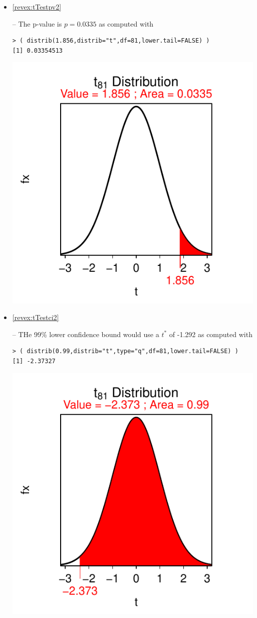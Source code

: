 \documentclass[10pt,openany]{book}\usepackage[]{graphicx}\usepackage[]{color}
\makeatletter
\newenvironment{kframe}{%
 \def\at@end@of@kframe{}%
 \ifinner\ifhmode%
  \def\at@end@of@kframe{\end{minipage}}%
  \begin{minipage}{\columnwidth}%
 \fi\fi%
 \def\FrameCommand##1{\hskip\@totalleftmargin \hskip-\fboxsep
 \colorbox{shadecolor}{##1}\hskip-\fboxsep
     \hskip-\linewidth \hskip-\@totalleftmargin \hskip\columnwidth}%
 \MakeFramed {\advance\hsize-\width
   \@totalleftmargin\z@ \linewidth\hsize
   \@setminipage}}%
 {\par\unskip\endMakeFramed%
 \at@end@of@kframe}
\newenvironment{knitrout}{}{} %
\makeatother
\begin{document}
\begin{itemize}
\begin{knitrout}
{}



\end{knitrout}
  \item \hypertarget{ans:tTestpv2}{\ref{revex:tTestpv2}} -- The p-value is $p=0.0335$ as computed with
\begin{knitrout}
\color{fgcolor}\begin{kframe}
\begin{verbatim}
> ( distrib(1.856,distrib="t",df=81,lower.tail=FALSE) )
[1] 0.03354513
\end{verbatim}
\end{kframe}

{\centering \includegraphics[width=.4\linewidth]{Figs/unnamed-chunk-356-1} 

}



\end{knitrout}
  \item \hypertarget{ans:tTestci2}{\ref{revex:tTestci2}} -- THe 99\% lower confidence bound would use a $t^{*}$ of -1.292 as computed with
\begin{knitrout}
\color{fgcolor}\begin{kframe}
\begin{verbatim}
> ( distrib(0.99,distrib="t",type="q",df=81,lower.tail=FALSE) )
[1] -2.37327
\end{verbatim}
\end{kframe}

{\centering \includegraphics[width=.4\linewidth]{Figs/unnamed-chunk-357-1} 

}
\end{knitrout}
\end{itemize}
\end{document}
